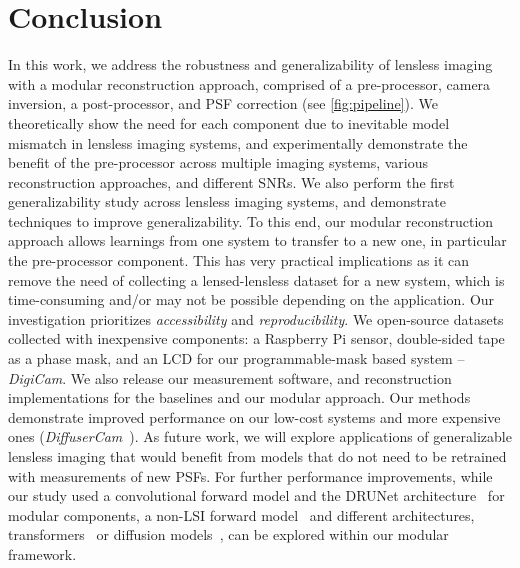 \section{Conclusion}

\noindent In this work, we address the robustness and generalizability of lensless imaging with a modular reconstruction approach, comprised of a pre-processor, camera inversion, a post-processor, and PSF correction (see \cref{fig:pipeline}).
We theoretically show the need for each component due to inevitable model mismatch in lensless imaging systems,
and experimentally demonstrate the benefit of the pre-processor across multiple imaging systems, various reconstruction approaches, and different SNRs.
We also perform the first generalizability study across lensless imaging systems, 
and demonstrate techniques to improve generalizability.
To this end, our modular reconstruction approach allows learnings from one system to transfer to a new one,
in particular the pre-processor component.
This has very practical implications as it can remove the need of collecting a lensed-lensless dataset for a new system,
which is time-consuming and/or may not be possible depending on the application.
Our investigation prioritizes \textit{accessibility} and \textit{reproducibility}.
We open-source datasets collected with inexpensive components: a Raspberry Pi sensor, double-sided tape as a phase mask, and an LCD for our programmable-mask based system -- \textit{DigiCam}.
We also release our measurement software, and reconstruction implementations for the baselines and our modular approach.
Our methods demonstrate improved performance on our low-cost systems and more expensive ones (\textit{DiffuserCam}~\cite{Monakhova:19}).
As future work, we will explore applications of generalizable lensless imaging that would benefit from models that do not need to be retrained with measurements of new PSFs.
For further performance improvements, while our study used a convolutional forward model and the DRUNet architecture~\cite{zhang2021plug} for modular components,
a non-LSI forward model~\cite{Yanny:22,cai2024phocolens} and
different architectures, \eg transformers~\cite{Zamir2021Restormer,Pan:22} or diffusion models~\cite{cai2024phocolens}, can be explored within our modular framework.


